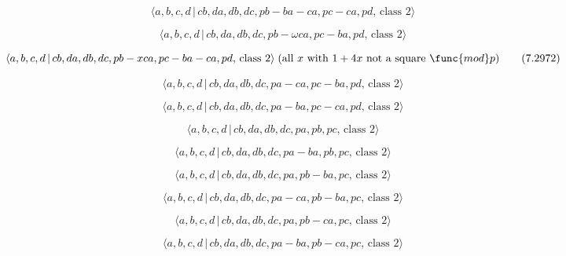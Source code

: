 \documentclass[10pt]{article}
\begin{document}
\begin{equation}
\langle a,b,c,d\,|\,cb,da,db,dc,pb-ba-ca,pc-ca,pd,\,\text{class }2\rangle 
\tag{7.2970}
\end{equation}

\begin{equation}
\langle a,b,c,d\,|\,cb,da,db,dc,pb-\omega ca,pc-ba,pd,\,\text{class }2\rangle
\tag{7.2971}
\end{equation}

\begin{equation}
\langle a,b,c,d\,|\,cb,da,db,dc,pb-xca,pc-ba-ca,pd,\,\text{class }2\rangle
\;(\text{all }x\text{ with }1+4x\text{ not a square }\func{mod}p) 
\tag{7.2972}
\end{equation}

\begin{equation}
\langle a,b,c,d\,|\,cb,da,db,dc,pa-ca,pc-ba,pd,\,\text{class }2\rangle 
\tag{7.2973}
\end{equation}

\begin{equation}
\langle a,b,c,d\,|\,cb,da,db,dc,pa-ba,pc-ca,pd,\,\text{class }2\rangle 
\tag{7.2974}
\end{equation}

\begin{equation}
\langle a,b,c,d\,|\,cb,da,db,dc,pa,pb,pc,\,\text{class }2\rangle 
\tag{7.2975}
\end{equation}

\begin{equation}
\langle a,b,c,d\,|\,cb,da,db,dc,pa-ba,pb,pc,\,\text{class }2\rangle 
\tag{7.2976}
\end{equation}

\begin{equation}
\langle a,b,c,d\,|\,cb,da,db,dc,pa,pb-ba,pc,\,\text{class }2\rangle 
\tag{7.2977}
\end{equation}

\begin{equation}
\langle a,b,c,d\,|\,cb,da,db,dc,pa-ca,pb-ba,pc,\,\text{class }2\rangle 
\tag{7.2978}
\end{equation}

\begin{equation}
\langle a,b,c,d\,|\,cb,da,db,dc,pa,pb-ca,pc,\,\text{class }2\rangle 
\tag{7.2979}
\end{equation}

\begin{equation}
\langle a,b,c,d\,|\,cb,da,db,dc,pa-ba,pb-ca,pc,\,\text{class }2\rangle 
\tag{7.2980}
\end{equation}
\end{document}
